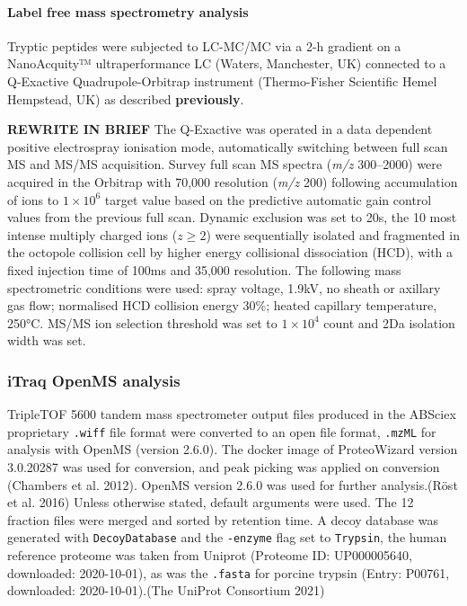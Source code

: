 \documentclass[9pt,lineno]{elife}
\begin{document}
\hypertarget{label-free-mass-spectrometry-analysis}{%
\paragraph{Label free mass spectrometry analysis}\label{label-free-mass-spectrometry-analysis}}

Tryptic peptides were subjected to LC-MC/MC via a 2-h gradient on a NanoAcquity™ ultraperformance LC (Waters, Manchester, UK) connected to a Q-Exactive Quadrupole-Orbitrap instrument (Thermo-Fisher Scientific Hemel Hempstead, UK) as described \textbf{previously}.

\textbf{REWRITE IN BRIEF}
The Q-Exactive was operated in a data dependent positive electrospray ionisation mode, automatically switching between full scan MS and MS/MS acquisition.
Survey full scan MS spectra (\emph{m/z} 300--2000) were acquired in the Orbitrap with 70,000 resolution (\emph{m/z} 200) following accumulation of ions to \(1\times 10^6\) target value based on the predictive automatic gain control values from the previous full scan.
Dynamic exclusion was set to 20s, the 10 most intense multiply charged ions (\(z \geq 2\)) were sequentially isolated and fragmented in the octopole collision cell by higher energy collisional dissociation (HCD), with a fixed injection time of 100ms and 35,000 resolution.
The following mass spectrometric conditions were used: spray voltage, 1.9kV, no sheath or axillary gas flow; normalised HCD collision energy 30\%; heated capillary temperature, 250°C.
MS/MS ion selection threshold was set to \(1\times 10^4\) count and 2Da isolation width was set.

\hypertarget{openms-chap3}{%
\subsubsection{iTraq OpenMS analysis}\label{openms-chap3}}

TripleTOF 5600 tandem mass spectrometer output files produced in the ABSciex proprietary \texttt{.wiff} file format were converted to an open file format, \texttt{.mzML} for analysis with OpenMS (version 2.6.0). The docker image of ProteoWizard version 3.0.20287 was used for conversion, and peak picking was applied on conversion (Chambers et al. 2012). OpenMS version 2.6.0 was used for further analysis.(Röst et al. 2016)
Unless otherwise stated, default arguments were used.
The 12 fraction files were merged and sorted by retention time.
A decoy database was generated with \texttt{DecoyDatabase} and the \texttt{-enzyme} flag set to \texttt{Trypsin}, the human reference proteome was taken from Uniprot (Proteome ID: UP000005640, downloaded: 2020-10-01), as was the \texttt{.fasta} for porcine trypsin (Entry: P00761, downloaded: 2020-10-01).(The UniProt Consortium 2021)
\end{document}
